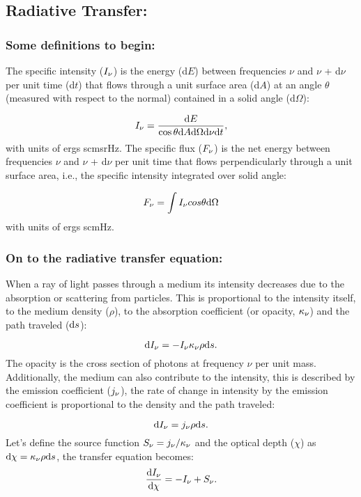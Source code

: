 \documentclass[letterpaper,12pt]{article}
\begin{document}
\subsection{Radiative Transfer:}

\subsubsection{Some definitions to begin:}
The specific intensity ($I\sb{\nu}$) is the
energy (d$E$) between frequencies $\nu$ and $\nu$ + d$\nu$ per unit
time (d$t$) that flows through a unit surface area (d$A$) at an angle
$\theta$ (measured with respect to the normal) contained in a solid
angle (d$\Omega$):

\begin{equation}
I\sb{\nu} = \frac{\der E}{\cos\theta \der A \der\Omega \der\nu \der t},
\end{equation}
with units of ergs s\tno cm\tnt sr\tno Hz\tno.  The specific flux
($F\sb{\nu}$) is the net energy between frequencies $\nu$ and $\nu$ +
d$\nu$ per unit time that flows perpendicularly through a unit surface
area, i.e., the specific intensity integrated over solid angle:

\begin{equation}
F\sb{\nu} = \int I\sb{\nu} cos\theta \der\Omega
\end{equation}
with units of ergs s\tno cm\tnt Hz\tno.

\subsubsection{On to the radiative transfer equation:} 
When a ray of light passes
through a medium its intensity decreases due to the absorption or
scattering from particles. This is proportional to the intensity
itself, to the medium density ($\rho$), to the absorption coefficient
(or opacity, $\kappa\sb{\nu}$) and the path traveled (${\rm d} s$):

\begin{equation}
\der I\sb{\nu} = - I\sb{\nu} \kappa\sb{\nu} \rho \der s.
\end{equation}
The opacity is the cross section of photons at frequency $\nu$ per
unit mass.  Additionally, the medium can also contribute to the
intensity, this is described by the emission coefficient
($j\sb{\nu}$), the rate of change in intensity by the emission
coefficient is proportional to the density and the path traveled:

\begin{equation}
\der I\sb{\nu} =  j\sb{\nu} \rho \der s.
\end{equation}
Let's define the source function $S\sb{\nu} =
j\sb{\nu}/\kappa\sb{\nu}$ and the optical depth ($\chi$) as $\der
\chi = \kappa\sb{\nu} \rho \der s$, the transfer equation becomes:
\begin{equation}
\frac{\der I\sb{\nu}}{\der \chi} = - I\sb{\nu}  +  S\sb{\nu}.
\end{equation}
\end{document}
